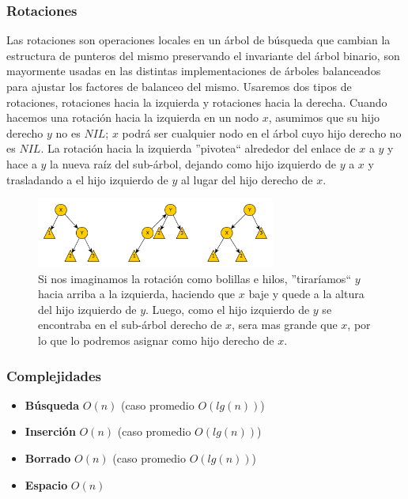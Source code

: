 
\subsubsection{Rotaciones}

Las rotaciones son operaciones locales en un \'arbol de b\'usqueda que cambian la estructura de punteros del mismo preservando el invariante del \'arbol binario, son mayormente usadas en las distintas implementaciones de \'arboles balanceados para ajustar los factores de balanceo del mismo. Usaremos dos tipos de rotaciones, rotaciones hacia la izquierda y rotaciones hacia la derecha. Cuando hacemos una rotaci\'on hacia la izquierda en un nodo $x$, asumimos que su hijo derecho $y$ no es $NIL$; $x$ podr\'a ser cualquier nodo en el \'arbol cuyo hijo derecho no es $NIL$. La rotaci\'on hacia la izquierda ''pivotea`` alrededor del enlace de $x$ a $y$ y hace a $y$ la nueva ra\'iz del sub-\'arbol, dejando como hijo izquierdo de $y$ a $x$ y trasladando a el hijo izquierdo de $y$ al lugar del hijo derecho de $x$. 

\begin{figure}
 \centering
 \includegraphics[width=0.7\textwidth]{graficos/RBRotacionIzq.pdf}
 \caption*{\newline \footnotesize Si nos imaginamos la rotaci\'on como bolillas e hilos, ''tirar\'iamos`` $y$ hacia arriba a la izquierda, haciendo que $x$ baje y quede a la altura del hijo izquierdo de $y$. Luego, como el hijo izquierdo de $y$ se encontraba en el sub-\'arbol derecho de $x$, sera mas grande que $x$, por lo que lo podremos asignar como hijo derecho de $x$.}
\end{figure}



\subsubsection{Complejidades}

\begin{itemize}
 \item \textbf{B\'usqueda} $O(n)$ (caso promedio $O(lg(n))$)
 \item \textbf{Inserci\'on} $O(n)$ (caso promedio $O(lg(n))$)
 \item \textbf{Borrado} $O(n)$ (caso promedio $O(lg(n))$)
 \item \textbf{Espacio} $O(n)$
\end{itemize}

